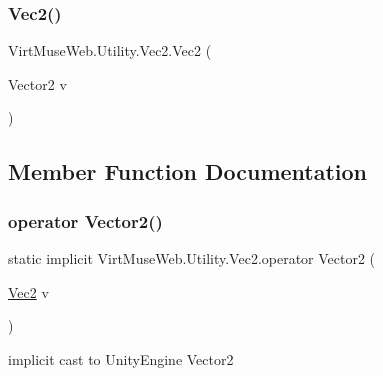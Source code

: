 \subsubsection{\texorpdfstring{Vec2()}{Vec2()}\hspace{0.1cm}{\footnotesize\ttfamily [3/3]}}
{\footnotesize\ttfamily Virt\+Muse\+Web.\+Utility.\+Vec2.\+Vec2 (\begin{DoxyParamCaption}\item[{Vector2}]{v }\end{DoxyParamCaption})}



\subsection{Member Function Documentation}
\mbox{\label{class_virt_muse_web_1_1_utility_1_1_vec2_ae7eea094143341c9797862761fd1b6d9}} 
\subsubsection{\texorpdfstring{operator Vector2()}{operator Vector2()}}
{\footnotesize\ttfamily static implicit Virt\+Muse\+Web.\+Utility.\+Vec2.\+operator Vector2 (\begin{DoxyParamCaption}\item[{\mbox{\hyperlink{class_virt_muse_web_1_1_utility_1_1_vec2}{Vec2}}}]{v }\end{DoxyParamCaption})\hspace{0.3cm}{\ttfamily [static]}}



implicit cast to Unity\+Engine Vector2 


